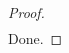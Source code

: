 \documentclass[a4paper, 12pt]{article} %
\begin{document}
\begin{CJK}{UTF8}{gkai}
\begin{proof}
\begin{align*}
\end{align*}
Done.
  \end{proof}
  
  
  
  
  
\end{CJK}
\end{document}
